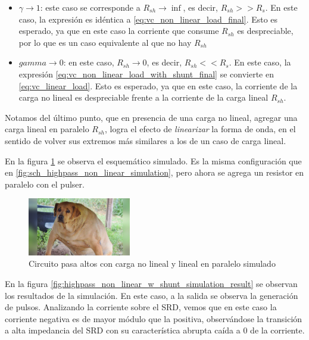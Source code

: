 \begin{itemize}
    \item $\gamma \to 1$: este caso se corresponde a $R_{sh} \to \inf$, es
        decir, $R_{sh} >> R_s$. En este caso, la expresión es idéntica a
        \ref{eq:vc_non_linear_load_final}. Esto es esperado, ya que en este caso
        la corriente que consume $R_{sh}$ es despreciable, por lo que es un caso
        equivalente al que no hay $R_{sh}$
    \item $gamma \to 0$: en este caso, $R_{sh} \to 0$, es decir, $R_{sh} <<
        R_s$. En este caso, la expresión
        \ref{eq:vc_non_linear_load_with_shunt_final} se convierte en
        \ref{eq:vc_linear_load}. Esto es esperado, ya que en este caso, la
        corriente de la carga no lineal es despreciable frente a la corriente
        de la carga lineal $R_{sh}$.
\end{itemize}

Notamos del último punto, que en presencia de una carga no lineal, agregar una
carga lineal en paralelo $R_{sh}$, logra el efecto de \textit{linearizar} la
forma de onda, en el sentido de volver sus extremos más similares a los de un
caso de carga lineal.

En la figura \ref{fig:sch_highpass_non_linear_w_shunt_simulation} se observa el
esquemático simulado. Es la misma configuración que en
\ref{fig:sch_highpass_non_linear_simulation}, pero ahora se  agrega un resistor
en paralelo con el pulser.

\begin{figure}[tbp]
    \centering
    \includegraphics[width=0.4\textwidth]{images/placeholder.jpg}
    \caption{Circuito pasa altos con carga no lineal y lineal en paralelo simulado}
    \label{fig:sch_highpass_non_linear_w_shunt_simulation}
\end{figure}

En la figura \ref{fig:highpass_non_linear_w_shunt_simulation_result} se observan
los resultados de la simulación. En este caso, a la salida se observa la
generación de pulsos. Analizando la corriente sobre el SRD, vemos que en este
caso la corriente negativa es de mayor módulo que la positiva, observándose la
transición a alta impedancia del SRD con su característica abrupta caída a $0$
de la corriente.

